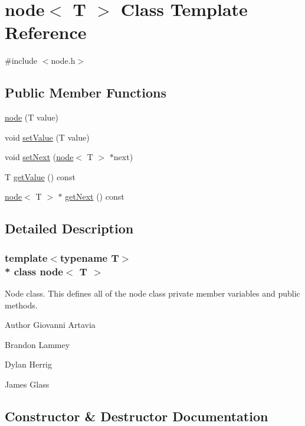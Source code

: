 \hypertarget{classnode}{}\section{node$<$ T $>$ Class Template Reference}
\label{classnode}


{\ttfamily \#include $<$node.\+h$>$}

\subsection*{Public Member Functions}
\begin{DoxyCompactItemize}
\item 
\hyperlink{classnode_a8b84a889cdb6da341c5c930ec13ed7ff}{node} (T value)
\item 
void \hyperlink{classnode_aa2f5fc0ca069085519055c6efd385144}{set\+Value} (T value)
\item 
void \hyperlink{classnode_abfa39769660ee5f0ce6918f0ec6d4a4a}{set\+Next} (\hyperlink{classnode}{node}$<$ T $>$ $\ast$next)
\item 
T \hyperlink{classnode_ae59897d6bd56d78aa85819bb070c2d6d}{get\+Value} () const 
\item 
\hyperlink{classnode}{node}$<$ T $>$ $\ast$ \hyperlink{classnode_a38bfeb3c2ff0ff94689ad444bd60f1b3}{get\+Next} () const 
\end{DoxyCompactItemize}


\subsection{Detailed Description}
\subsubsection*{template$<$typename T$>$\\*
class node$<$ T $>$}

Node class. This defines all of the node class\textquotesingle{} private member variables and public methods. \begin{DoxyAuthor}{Author}
Giovanni Artavia 

Brandon Lammey 

Dylan Herrig 

James Glass 
\end{DoxyAuthor}


\subsection{Constructor \& Destructor Documentation}

